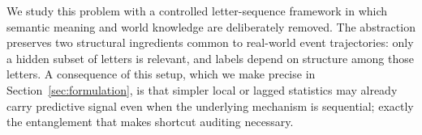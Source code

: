 \documentclass{article}
\theoremstyle{plain}
\theoremstyle{definition}
\theoremstyle{remark}
\begin{document}




We study this problem with a controlled letter-sequence framework in which semantic meaning and world knowledge are deliberately removed. The abstraction preserves two structural ingredients common to real-world event trajectories: only a hidden subset of letters is relevant, and labels depend on structure among those letters. A consequence of this setup, which we make precise in Section~\ref{sec:formulation}, is that simpler local or lagged statistics may already carry predictive signal even when the underlying mechanism is sequential; exactly the entanglement that makes shortcut auditing necessary.
\end{document}
